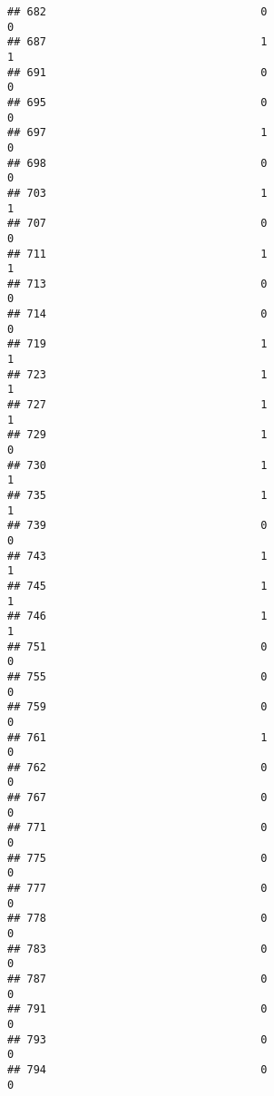 \documentclass[
]{article}
\begin{document}
\begin{verbatim}
## 682                                 0                                0
## 687                                 1                                1
## 691                                 0                                0
## 695                                 0                                0
## 697                                 1                                0
## 698                                 0                                0
## 703                                 1                                1
## 707                                 0                                0
## 711                                 1                                1
## 713                                 0                                0
## 714                                 0                                0
## 719                                 1                                1
## 723                                 1                                1
## 727                                 1                                1
## 729                                 1                                0
## 730                                 1                                1
## 735                                 1                                1
## 739                                 0                                0
## 743                                 1                                1
## 745                                 1                                1
## 746                                 1                                1
## 751                                 0                                0
## 755                                 0                                0
## 759                                 0                                0
## 761                                 1                                0
## 762                                 0                                0
## 767                                 0                                0
## 771                                 0                                0
## 775                                 0                                0
## 777                                 0                                0
## 778                                 0                                0
## 783                                 0                                0
## 787                                 0                                0
## 791                                 0                                0
## 793                                 0                                0
## 794                                 0                                0

\end{verbatim}
\end{document}
